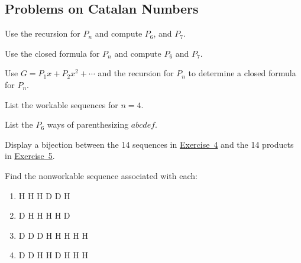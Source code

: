 \documentclass[10pt,]{book}
\theoremstyle{plain}
\theoremstyle{definition}
\theoremstyle{definition}
\theoremstyle{definition}
\theoremstyle{definition}
\numberwithin{equation}{chapter}
\begin{document}
\subsection*{Problems on Catalan Numbers}\label{exercises-6}
\begin{divisionexercise}{1}\hypertarget{exercise-51}{}
\hypertarget{p-806}{}%
Use the recursion for \(P_{n}\) and compute \(P_{6}\), and \(P_{7}\).%
\end{divisionexercise}%
\begin{divisionexercise}{2}\hypertarget{exercise-52}{}
\hypertarget{p-807}{}%
Use the closed formula for \(P_n\) and compute \(P_{6}\) and \(P_{7}\).%
\end{divisionexercise}%
\begin{divisionexercise}{3}\hypertarget{exercise-53}{}
\hypertarget{p-808}{}%
Use \(G = P_{1}x + P_{2}x^{2} +\cdots\) and the recursion for \(P_{n}\) to determine a closed formula for \(P_{n}\).%
\end{divisionexercise}%
\begin{divisionexercise}{4}\hypertarget{prob-workseq}{}
\hypertarget{p-809}{}%
List the workable sequences for \(n = 4\).%
\end{divisionexercise}%
\begin{divisionexercise}{5}\hypertarget{prob-parenth}{}
\hypertarget{p-810}{}%
List the \(P_{6}\) ways of parenthesizing \(abcdef\).%
\end{divisionexercise}%
\begin{divisionexercise}{6}\hypertarget{exercise-56}{}
\hypertarget{p-811}{}%
Display a bijection between the 14 sequences in \hyperlink{prob-workseq}{Exercise~4} and the 14 products in \hyperlink{prob-parenth}{Exercise~5}.%
\end{divisionexercise}%
\begin{divisionexercise}{7}\hypertarget{exercise-57}{}
\hypertarget{p-812}{}%
Find the nonworkable sequence associated with each: \leavevmode%
\begin{enumerate}[label=(\alph*)]
\item\hypertarget{li-114}{}\hypertarget{p-813}{}%
H H H D D H%
\item\hypertarget{li-115}{}\hypertarget{p-814}{}%
D H H H H D%
\item\hypertarget{li-116}{}\hypertarget{p-815}{}%
D D D H H H H H%
\item\hypertarget{li-117}{}\hypertarget{p-816}{}%
D D H H D H H H%
\end{enumerate}
%
\end{divisionexercise}%
\end{document}
